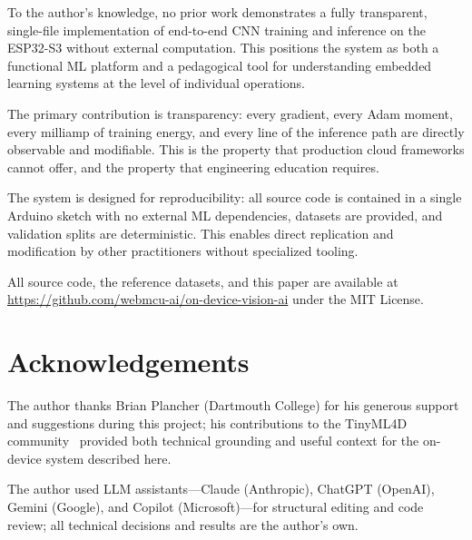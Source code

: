 \documentclass[12pt]{article}
\begin{document}
To the author's knowledge, no prior work demonstrates a fully transparent, single-file
implementation of end-to-end CNN training and inference on the ESP32-S3 without
external computation.
This positions the system as both a functional ML platform and a pedagogical
tool for understanding embedded learning systems at the level of individual
operations.

The primary contribution is transparency: every gradient, every Adam moment,
every milliamp of training energy, and every line of the inference path are
directly observable and modifiable.
This is the property that production cloud frameworks cannot offer, and the
property that engineering education requires.

The system is designed for reproducibility: all source code is contained in a
single Arduino sketch with no external ML dependencies, datasets are provided,
and validation splits are deterministic.
This enables direct replication and modification by other practitioners without
specialized tooling.

All source code, the reference datasets, and this paper are available at
\url{https://github.com/webmcu-ai/on-device-vision-ai} under the MIT License.

\section*{Acknowledgements}

The author thanks Brian Plancher (Dartmouth College) for his generous support and
suggestions during this project; his contributions to the TinyML4D community~\cite{plancher2024tinyml4d}
provided both technical grounding and useful context for the on-device system described here.

The author used LLM assistants---Claude (Anthropic), ChatGPT (OpenAI),
Gemini (Google), and Copilot (Microsoft)---for structural editing and code
review; all technical decisions and results are the author's own.

\end{document}
